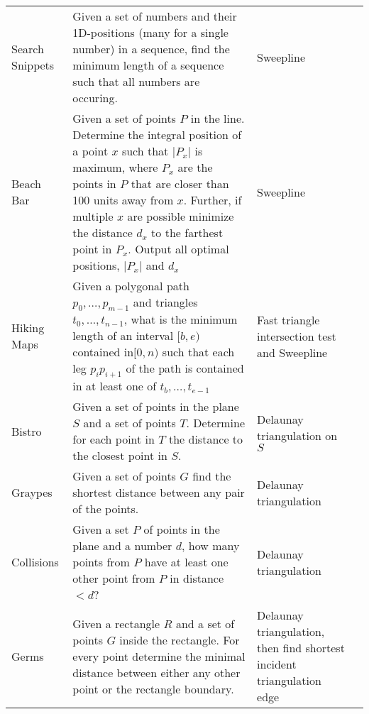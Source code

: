 \documentclass[a4paper, 10pt]{article}
\begin{document}
\begin{longtable}{ L{2cm} L{8cm} L{4cm} r}
        Search Snippets 
        & Given a set of numbers and their 1D-positions (many for a single number) in a sequence, find the minimum length 
            of a sequence such that all numbers are occuring.       
        & Sweepline &  \pageref{sec:search_snippets} \\

        Beach Bar 
        & Given a set of points $P$ in the line. 
            Determine the integral position of a point $x$ such that $|P_x|$ is maximum, 
            where $P_x$ are the points in $P$ that are closer than 100 units away from $x$.
            Further, if multiple $x$ are possible minimize the distance $d_x$ to the farthest point in $P_x$. 
            Output all optimal positions, $|P_x|$ and $d_x$  
        & Sweepline &  \pageref{sec:beach_bar} \\

        Hiking Maps 
        & Given a polygonal path $p_0,\dots,p_{m-1}$ and triangles $t_0,\dots,t_{n-1}$, what is the minimum length of 
            an interval $[b,e)$contained in$[0,n)$ such that each leg $p_ip_{i+1}$ of the path is contained in at least one of
                    $t_b,\dots,t_{e-1}$
        & Fast triangle intersection test and Sweepline &  \pageref{sec:hiking_maps} \\

        Bistro 
        & Given a set of points in the plane $S$ and a set of points $T$. Determine for each point in $T$ the distance to the closest point in $S$.
        & Delaunay triangulation on $S$ &  \pageref{sec:bistro} \\

        Graypes 
        & Given a set of points $G$ find the shortest distance between any pair of the points.
        & Delaunay triangulation & \pageref{sec:graypes} \\

        Collisions 
        & Given a set $P$ of points in the plane and a number $d$, 
            how many points from $P$ have at least one other point from $P$ in distance $<d$?        
        & Delaunay triangulation &  \pageref{sec:collisions} \\

        Germs 
        & Given a rectangle $R$ and a set of points $G$ inside the rectangle. For every point determine the minimal distance between either any other 
            point or the rectangle boundary.
        & Delaunay triangulation, then find shortest incident triangulation edge & \pageref{sec:germs} \\


\end{longtable}
\end{document}
